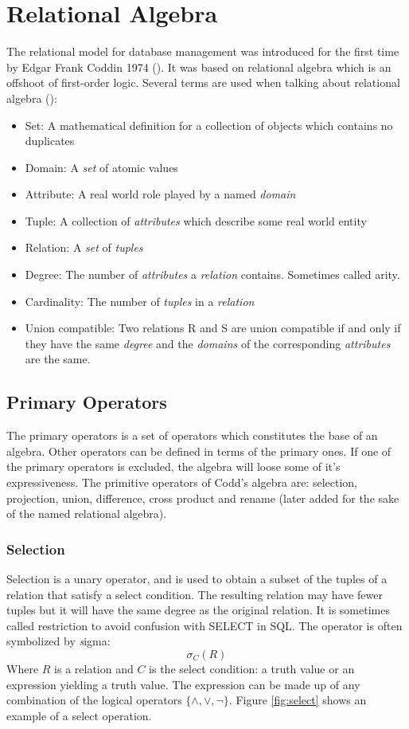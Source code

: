 \section{Relational Algebra}
The relational model for database management was introduced for the first time by Edgar Frank Coddin 1974 (\cite{TDT4225}). It was based on relational algebra which is an offshoot of first-order logic. Several terms are used when talking about relational algebra (\cite{gordonRussel, newYorkDB, sudarshan}):
\begin{itemize}
\item Set: A mathematical definition for a collection of objects which contains no duplicates
\item Domain: A \textit{set} of atomic values
\item Attribute: A real world role played by a named \textit{domain}
\item Tuple: A collection of \textit{attributes} which describe some real world entity
\item Relation: A \textit{set} of \textit{tuples}
\item Degree: The number of \textit{attributes} a \textit{relation} contains. Sometimes called arity.
\item Cardinality: The number of \textit{tuples} in a \textit{relation}
\item Union compatible: Two relations R and S are union compatible if and only if they have the same \textit{degree} and the \textit{domains} of the corresponding \textit{attributes} are the same.
\end{itemize}
\subsection{Primary Operators}
The primary operators is a set of operators which constitutes the base of an algebra. Other operators can be defined in terms of the primary ones. If one of the primary operators is excluded, the algebra will loose some of it's expressiveness. The primitive operators of Codd's algebra are: selection, projection, union, difference, cross product and rename (later added for the sake of the named relational algebra).
\subsubsection{Selection}
Selection is a unary operator, and is used to obtain a subset of the tuples of a relation that satisfy a select condition. The resulting relation may have fewer tuples but it will have the same degree as the original relation. It is sometimes called restriction to avoid confusion with SELECT in SQL. The operator is often symbolized by \emph{s}igma: 
\begin{equation*}
\sigma_{C}(R)
\end{equation*}
Where $R$ is a relation and $C$ is the select condition: a truth value or an expression yielding a truth value. The expression can be made up of any combination of the logical operators \begin{math}\{ \wedge, \vee, \neg\}\end{math}. Figure \ref{fig:select} shows an example of a select operation.

